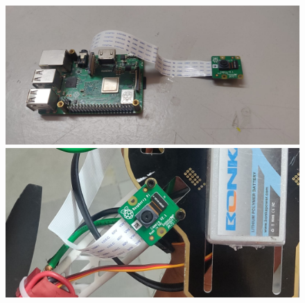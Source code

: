 \documentclass{article}
\begin{document}
\begin{figure}[!htb]
              \includegraphics[width=\linewidth]{./figs/hardware/cam.jpeg}
            \endminipage\hfill
              \includegraphics[width=\linewidth]{./figs/hardware/camfixed.jpeg}
            \endminipage
\end{figure}
\end{document}
